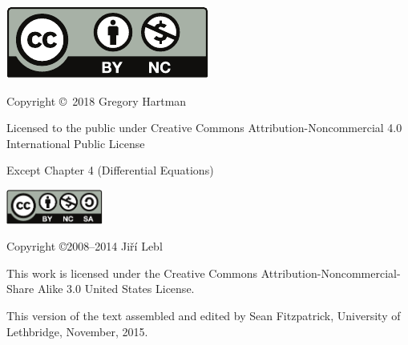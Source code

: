 \noindent\hskip -1in\begin{minipage}{2in}
\includegraphics{text/by-nc} 
\end{minipage}
\begin{minipage}{3in}
\noindent Copyright \copyright\ 2018 Gregory Hartman

Licensed to the public under Creative Commons Attribution-Noncommercial 4.0 International Public License
\end{minipage}

\bigskip

\bigskip

Except Chapter 4 (Differential Equations) 

\bigskip

\bigskip

\noindent\hskip -1in\begin{minipage}{2in}
\includegraphics[width=1.25in]{figures/license} 
\end{minipage}
\begin{minipage}{3in}
\noindent Copyright \copyright 2008--2014 Ji{\v r}\'i Lebl

This work is licensed under the Creative Commons
Attribution-Non\-commercial-Share Alike 3.0 United States License. 
\end{minipage}

\bigskip

\bigskip

This version of the text assembled and edited by Sean Fitzpatrick, University of Lethbridge, November, 2015. 
